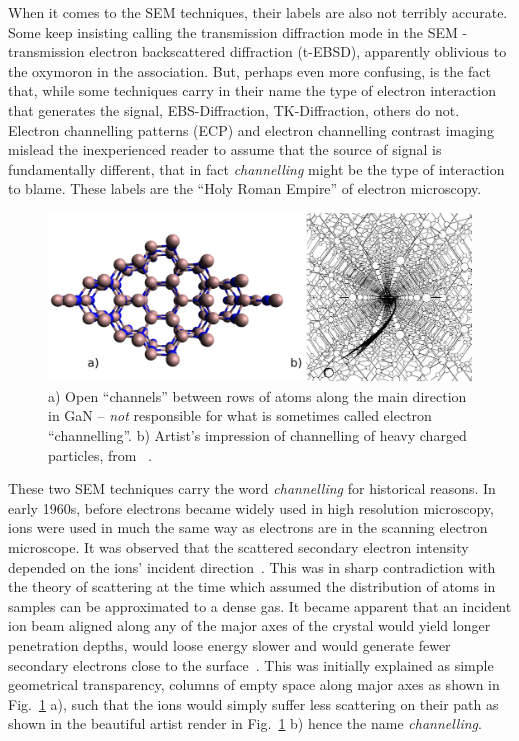 When it comes to the SEM techniques, their labels are also not terribly accurate. Some keep insisting calling the transmission diffraction  mode in the SEM - transmission electron backscattered diffraction (t-EBSD), apparently oblivious to the oxymoron in the  association. But, perhaps even more confusing, is the fact that, while some techniques carry in their name the type of electron interaction that generates the signal, EBS-Diffraction, TK-Diffraction, others do not. Electron channelling patterns (ECP) and electron channelling contrast imaging mislead the inexperienced reader to assume that the source of signal is fundamentally different, that in fact \textit{channelling} might be the type of interaction to blame. These labels are the ``Holy Roman Empire'' of electron microscopy. 

\begin{figure}[!h]
    \centering
\includegraphics[width=1\linewidth]{Figures/channel2.png}
\caption[``Channels'']{ a) Open ``channels'' between rows of atoms along the main direction \hkl[001] in GaN -- \emph{not} responsible for what is sometimes called electron ``channelling''. b) Artist's impression of channelling of heavy charged particles, from~\cite{Brandt68} .}
\label{Fig:channels}
\end{figure}


These two SEM techniques carry the word \textit{channelling} for historical reasons. In early 1960s, before electrons became widely used in high resolution microscopy, ions were used in much the same way as electrons are in the scanning electron microscope. It was observed that the scattered secondary electron intensity depended on the ions' incident direction~\cite{Davies83}. This was in sharp contradiction with the 
theory of scattering at the time which assumed the distribution of atoms in samples can be approximated to a dense gas. It became apparent that an incident ion beam aligned along any of the major axes of the crystal would yield longer penetration depths, would loose energy slower and would generate fewer secondary electrons close to the surface~\cite{Piercy63}. This was initially explained as simple geometrical transparency, \ie columns of empty space along major axes as shown in Fig.~\ref{Fig:channels} a), such that the ions would simply suffer less scattering on their path as shown in the beautiful artist render in Fig.~\ref{Fig:channels} b) hence the name \textit{channelling}.


